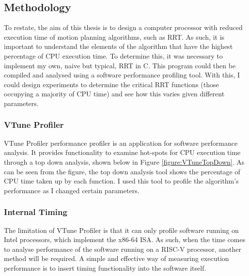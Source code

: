 

\subsection{Methodology}
    To restate, the aim of this thesis is to design a computer processor with reduced execution time of motion planning algorithms, such as \ac{RRT}. As such, it is important to understand the elements of the algorithm that have the highest percentage of CPU execution time. To determine this, it was necessary to implement my own, naive but typical, \ac{RRT} in C. This program could then be compiled and analysed using a software performance profiling tool. With this, I could design experiments to determine the critical RRT functions (those occupying a majority of CPU time) and see how this varies given different parameters.

    \subsubsection*{VTune Profiler}
    \label{subsubsection:vtune}
        VTune Profiler performance profiler is an application for software performance analysis. It provides functionality to examine hot-spots for CPU execution time through a top down analysis, shown below in Figure \ref{figure:VTuneTopDown}. As can be seen from the figure, the top down analysis tool shows the percentage of CPU time taken up by each function. I used this tool to profile the algorithm's performance as I changed certain parameters.
        

    \subsubsection*{Internal Timing}
        The limitation of VTune Profiler is that it can only profile software running on Intel processors, which implement the x86-64 \ac{ISA}. As such, when the time comes to analyse performance of the software running on a RISC-V processor, another method will be required. A simple and effective way of measuring execution performance is to insert timing functionality into the software itself. \\

